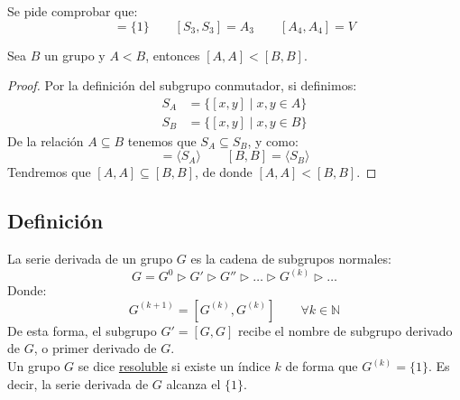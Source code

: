 \begin{ejercicio*}
    Se pide comprobar que:
    \begin{equation*}
        [A_3,A_3] = \{1\} \qquad 
        [S_3,S_3] = A_3 \qquad 
        [A_4, A_4] = V
    \end{equation*}
\end{ejercicio*}

\begin{lema}\label{lema:resolubles}
    Sea $B$ un grupo y $A<B$, entonces $[A,A] < [B,B]$.
    \begin{proof}
        Por la definición del subgrupo conmutador, si definimos:
        \begin{align*}
            S_A &= \{[x,y] \mid x,y\in A\} \\
            S_B &= \{[x,y] \mid x,y\in B\} 
        \end{align*}
        De la relación $A\subseteq B$ tenemos que $S_A\subseteq S_B$, y como:
        \begin{equation*}
            [A,A] = \langle S_A \rangle  \qquad [B,B] = \langle S_B \rangle 
        \end{equation*}
        Tendremos que $[A,A]\subseteq [B,B]$, de donde $[A,A] < [B,B]$.
    \end{proof}
\end{lema}

\subsection{Definición}
\begin{definicion}
    La serie derivada de un grupo $G$ es la cadena de subgrupos normales:
    \begin{equation*}
        G = G^0 \rhd G' \rhd G'' \rhd \ldots \rhd G^{(k)} \rhd \ldots
    \end{equation*}
    Donde:
    \begin{equation*}
        G^{(k+1)} = [G^{(k)}, G^{(k)}] \qquad \forall k\in \mathbb{N}
    \end{equation*}
    De esta forma, el subgrupo $G' = [G,G]$ recibe el nombre de subgrupo derivado de $G$, o primer derivado de $G$.\\

    \noindent
    Un grupo $G$ se dice \underline{resoluble} si existe un índice $k$ de forma que $G^{(k)} = \{1\}$. Es decir, la serie derivada de $G$ alcanza el $\{1\}$.
\end{definicion}

